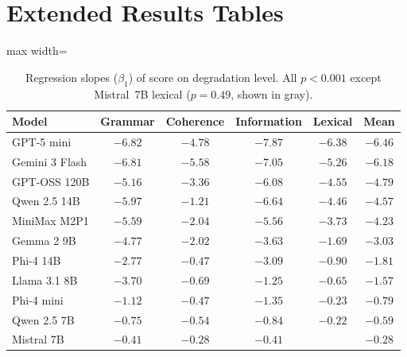 \documentclass[11pt]{article}
\begin{document}
\section{Extended Results Tables}
\label{app:diagnostics}

\begin{table}[H]
\centering
\caption{Regression slopes ($\beta_1$) of score on degradation level.
All $p < 0.001$ except Mistral~7B lexical ($p = 0.49$, shown in
gray).}
\label{tab:slopes_app}
\small
\begin{adjustbox}{max width=\columnwidth}
\begin{tabular}{@{}lccccc@{}}
\toprule
\textbf{Model} & \textbf{Grammar} & \textbf{Coherence} &
\textbf{Information} & \textbf{Lexical} & \textbf{Mean} \\
\midrule
GPT-5 mini     & $-6.82$ & $-4.78$ & $-7.87$ & $-6.38$ & $-6.46$ \\
Gemini 3 Flash & $-6.81$ & $-5.58$ & $-7.05$ & $-5.26$ & $-6.18$ \\
GPT-OSS 120B   & $-5.16$ & $-3.36$ & $-6.08$ & $-4.55$ & $-4.79$ \\
Qwen 2.5 14B   & $-5.97$ & $-1.21$ & $-6.64$ & $-4.46$ & $-4.57$ \\
MiniMax M2P1   & $-5.59$ & $-2.04$ & $-5.56$ & $-3.73$ & $-4.23$ \\
Gemma 2 9B     & $-4.77$ & $-2.02$ & $-3.63$ & $-1.69$ & $-3.03$ \\
Phi-4 14B      & $-2.77$ & $-0.47$ & $-3.09$ & $-0.90$ & $-1.81$ \\
Llama 3.1 8B   & $-3.70$ & $-0.69$ & $-1.25$ & $-0.65$ & $-1.57$ \\
Phi-4 mini     & $-1.12$ & $-0.47$ & $-1.35$ & $-0.23$ & $-0.79$ \\
Qwen 2.5 7B    & $-0.75$ & $-0.54$ & $-0.84$ & $-0.22$ & $-0.59$ \\
Mistral 7B     & $-0.41$ & $-0.28$ & $-0.41$ & \color{gray}{$-0.03$} & $-0.28$ \\
\bottomrule
\end{tabular}
\end{adjustbox}
\end{table}
\end{document}
